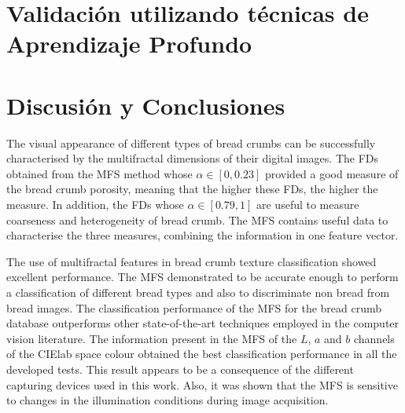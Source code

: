 

\section{Validación utilizando técnicas de Aprendizaje Profundo}

\section{Discusión y Conclusiones}

The visual appearance of different types of bread crumbs can be successfully characterised by the multifractal dimensions of their digital images. The FDs obtained from the MFS method whose $\alpha \in [0,0.23]$ provided a good measure of the bread crumb porosity, meaning that the higher these FDs, the higher the measure. In addition, the FDs whose $\alpha \in [0.79,1]$ are useful to measure coarseness and heterogeneity of bread crumb. The MFS contains useful data to characterise the three measures, combining the information in one feature vector.

The use of multifractal features in bread crumb texture classification showed excellent performance. The MFS de\-monstrated to be accurate enough to perform a classification of different bread types and also to discriminate non bread from bread images. The classification performance of the MFS for the bread crumb database outperforms other state-of-the-art techniques employed in the computer vision literature. The information present in the MFS of the $L$, $a$ and $b$ channels of the CIElab space colour obtained the best classification performance in all the developed tests. This result appears to be a consequence of the different capturing devices used in this work. Also, it was shown that the MFS is sensitive to changes in the illumination conditions during image acquisition.

